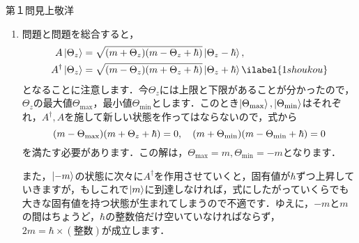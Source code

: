\begin{answer}{第１問}{見上敬洋}
\begin{enumerate}
\item
  問題と問題を総合すると，
  \begin{align}
  A \ket{\Theta_z} &= \sqrt{(m+\Theta_z)(m-\Theta_z+\hbar) }\ket{\Theta_z - \hbar} , \notag\\
  A^\dagger \ket{\Theta_z} &= \sqrt{(m-\Theta_z)(m+\Theta_z+\hbar) }\ket{\Theta_z + \hbar}  \ilabel{1shoukou}
  \end{align}
  となることに注意します．今$\Theta_z$には上限と下限があることが分かったので，$\Theta_z$の最大値$\Theta_\mathrm{max}$，最小値$\Theta_\mathrm{min}$とします．このとき$\left| {\Theta_\mathrm{max}} \right\rangle,\left| {\Theta_\mathrm{min}} \right\rangle$はそれぞれ，$A^\dagger,A$を施して新しい状態を作ってはならないので，式から
  \begin{equation}
  (m-\Theta_\mathrm{max})(m+\Theta_z+\hbar)  = 0, \quad (m+\Theta_\mathrm{min})(m-\Theta_\mathrm{min}+\hbar) = 0 \notag
  \end{equation}
  を満たす必要があります．この解は，$\Theta_\mathrm{max} = m, \Theta_\mathrm{min} =-m$となります．

  また，$\left| {-m} \right\rangle$の状態に次々に$A^\dagger$を作用させていくと，固有値が$\hbar $ずつ上昇していきますが，もしこれで$\left| {m} \right\rangle$に到達しなければ，式にしたがっていくらでも大きな固有値を持つ状態が生まれてしまうので不適です．ゆえに，$-m$と$m$の間はちょうど，$\hbar$の整数倍だけ空いていなければならず，$2m = \hbar \times (\text{整数})$が成立します．

\end{enumerate}
\end{answer}
